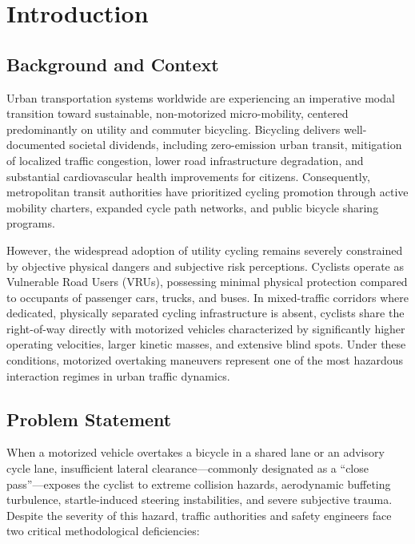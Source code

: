 \chapter{Introduction}
\label{chap:intro}

\section{Background and Context}
Urban transportation systems worldwide are experiencing an imperative modal transition toward sustainable, non-motorized micro-mobility, centered predominantly on utility and commuter bicycling. Bicycling delivers well-documented societal dividends, including zero-emission urban transit, mitigation of localized traffic congestion, lower road infrastructure degradation, and substantial cardiovascular health improvements for citizens. Consequently, metropolitan transit authorities have prioritized cycling promotion through active mobility charters, expanded cycle path networks, and public bicycle sharing programs.

However, the widespread adoption of utility cycling remains severely constrained by objective physical dangers and subjective risk perceptions. Cyclists operate as Vulnerable Road Users (VRUs), possessing minimal physical protection compared to occupants of passenger cars, trucks, and buses. In mixed-traffic corridors where dedicated, physically separated cycling infrastructure is absent, cyclists share the right-of-way directly with motorized vehicles characterized by significantly higher operating velocities, larger kinetic masses, and extensive blind spots. Under these conditions, motorized overtaking maneuvers represent one of the most hazardous interaction regimes in urban traffic dynamics.

\section{Problem Statement}
When a motorized vehicle overtakes a bicycle in a shared lane or an advisory cycle lane, insufficient lateral clearance---commonly designated as a ``close pass''---exposes the cyclist to extreme collision hazards, aerodynamic buffeting turbulence, startle-induced steering instabilities, and severe subjective trauma. Despite the severity of this hazard, traffic authorities and safety engineers face two critical methodological deficiencies:

